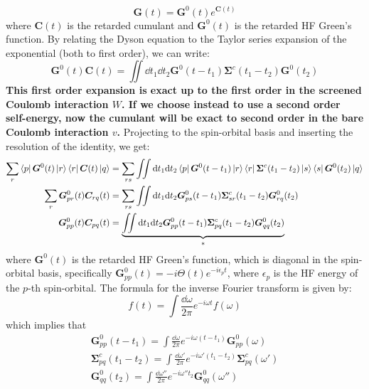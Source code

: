 \begin{equation}
    \bm{G}(t) = \bm{G}^0(t)e^{\bm{C}(t)}
\end{equation}
where $\bm{C}(t)$ is the retarded cumulant and $\bm{G}^0(t)$ is the retarded HF Green's function. By relating the Dyson equation to the Taylor series expansion of the exponential (both to first order), we can write:
\begin{equation}
    \bm{G}^0(t) \bm{C}(t) = \iint \dd t_1 \dd t_2 \bm{G}^0(t-t_1) \bm{\Sigma}^c(t_1 - t_2) \bm{G}^0(t_2)
\end{equation}
\textbf{This first order expansion is exact up to the first order in the screened Coulomb interaction $W$. If we choose instead to use a second order self-energy, now the cumulant will be exact to second order in the bare Coulomb interaction $v$.}
Projecting to the spin-orbital basis and inserting the resolution of the identity, we get:
\begin{align}
    \sum_{r}\bra{p}\bm{G}^0(t) \ket{r}\bra{r}\bm{C}(t)\ket{q} &= \sum_{rs}\iint \dd t_1 \dd t_2 \bra{p}\bm{G}^0(t-t_1)\ket{r} \bra{r}\bm{\Sigma}^c(t_1 - t_2)\ket{s} \bra{s}\bm{G}^0(t_2)\ket{q} \\
    \sum_{r}\bm{G}_{pr}^0(t) \bm{C}_{rq}(t) &= \sum_{rs}\iint \dd t_1 \dd t_2 \bm{G}_{ps}^0(t-t_1) \bm{\Sigma}_{sr}^c(t_1 - t_2) \bm{G}_{rq}^0(t_2)\\
    \bm{G}_{pp}^{0}(t) \bm{C}_{pq}(t) &= \underbrace{\iint \dd t_1 \dd t_2 \bm{G}_{pp}^{0}(t-t_1) \bm{\Sigma}_{pq}^c(t_1 - t_2) \bm{G}_{qq}^{0}(t_2)}_{*}
    \label{eqn:cumulant_connection}
\end{align}
where $\bm{G}^0(t)$ is the retarded HF Green's function, which is diagonal in the spin-orbital basis, specifically $\bm{G}_{pp}^{0}(t) = -i\Theta(t)e^{-i\epsilon_p t}$, where $\epsilon_p$ is the HF energy of the $p$-th spin-orbital.
The formula for the inverse Fourier transform is given by:
\begin{equation}
    f(t) = \int \frac{\dd \omega}{2\pi} e^{-i\omega t} f(\omega)
\end{equation}
which implies that
\begin{align}
    \bm{G}_{pp}^{0}(t-t_1) = \int \frac{\dd \omega}{2\pi} e^{-i\omega (t-t_1)} \bm{G}_{pp}^{0}(\omega)\\
    \bm{\Sigma}_{pq}^c(t_1 - t_2) = \int \frac{\dd \omega'}{2\pi} e^{-i\omega' (t_1 - t_2)} \bm{\Sigma}_{pq}^c(\omega')\\
    \bm{G}_{qq}^{0}(t_2) = \int \frac{\dd \omega''}{2\pi} e^{-i\omega'' t_2} \bm{G}_{qq}^{0}(\omega'')
\end{align}

